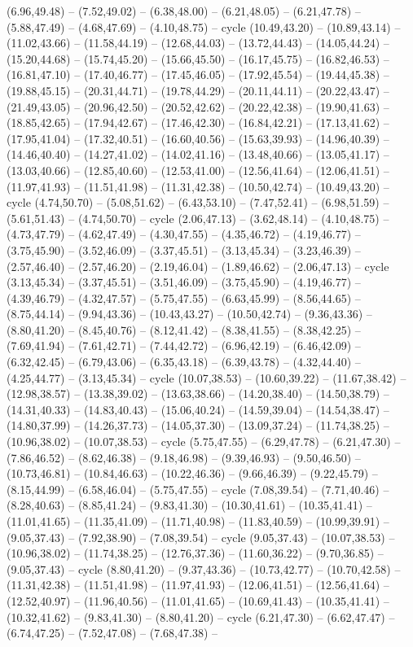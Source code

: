 {(6.96,49.48) -- (7.52,49.02) -- (6.38,48.00) -- (6.21,48.05) -- (6.21,47.78) -- (5.88,47.49) -- (4.68,47.69) -- (4.10,48.75) -- cycle (10.49,43.20) -- (10.89,43.14) -- (11.02,43.66) -- (11.58,44.19) -- (12.68,44.03) -- (13.72,44.43) -- (14.05,44.24) -- (15.20,44.68) -- (15.74,45.20) -- (15.66,45.50) -- (16.17,45.75) -- (16.82,46.53) -- (16.81,47.10) -- (17.40,46.77) -- (17.45,46.05) -- (17.92,45.54) -- (19.44,45.38) -- (19.88,45.15) -- (20.31,44.71) -- (19.78,44.29) -- (20.11,44.11) -- (20.22,43.47) -- (21.49,43.05) -- (20.96,42.50) -- (20.52,42.62) -- (20.22,42.38) -- (19.90,41.63) -- (18.85,42.65) -- (17.94,42.67) -- (17.46,42.30) -- (16.84,42.21) -- (17.13,41.62) -- (17.95,41.04) -- (17.32,40.51) -- (16.60,40.56) -- (15.63,39.93) -- (14.96,40.39) -- (14.46,40.40) -- (14.27,41.02) -- (14.02,41.16) -- (13.48,40.66) -- (13.05,41.17) -- (13.03,40.66) -- (12.85,40.60) -- (12.53,41.00) -- (12.56,41.64) -- (12.06,41.51) -- (11.97,41.93) -- (11.51,41.98) -- (11.31,42.38) -- (10.50,42.74) -- (10.49,43.20) -- cycle (4.74,50.70) -- (5.08,51.62) -- (6.43,53.10) -- (7.47,52.41) -- (6.98,51.59) -- (5.61,51.43) -- (4.74,50.70) -- cycle (2.06,47.13) -- (3.62,48.14) -- (4.10,48.75) -- (4.73,47.79) -- (4.62,47.49) -- (4.30,47.55) -- (4.35,46.72) -- (4.19,46.77) -- (3.75,45.90) -- (3.52,46.09) -- (3.37,45.51) -- (3.13,45.34) -- (3.23,46.39) -- (2.57,46.40) -- (2.57,46.20) -- (2.19,46.04) -- (1.89,46.62) -- (2.06,47.13) -- cycle (3.13,45.34) -- (3.37,45.51) -- (3.51,46.09) -- (3.75,45.90) -- (4.19,46.77) -- (4.39,46.79) -- (4.32,47.57) -- (5.75,47.55) -- (6.63,45.99) -- (8.56,44.65) -- (8.75,44.14) -- (9.94,43.36) -- (10.43,43.27) -- (10.50,42.74) -- (9.36,43.36) -- (8.80,41.20) -- (8.45,40.76) -- (8.12,41.42) -- (8.38,41.55) -- (8.38,42.25) -- (7.69,41.94) -- (7.61,42.71) -- (7.44,42.72) -- (6.96,42.19) -- (6.46,42.09) -- (6.32,42.45) -- (6.79,43.06) -- (6.35,43.18) -- (6.39,43.78) -- (4.32,44.40) -- (4.25,44.77) -- (3.13,45.34) -- cycle (10.07,38.53) -- (10.60,39.22) -- (11.67,38.42) -- (12.98,38.57) -- (13.38,39.02) -- (13.63,38.66) -- (14.20,38.40) -- (14.50,38.79) -- (14.31,40.33) -- (14.83,40.43) -- (15.06,40.24) -- (14.59,39.04) -- (14.54,38.47) -- (14.80,37.99) -- (14.26,37.73) -- (14.05,37.30) -- (13.09,37.24) -- (11.74,38.25) -- (10.96,38.02) -- (10.07,38.53) -- cycle (5.75,47.55) -- (6.29,47.78) -- (6.21,47.30) -- (7.86,46.52) -- (8.62,46.38) -- (9.18,46.98) -- (9.39,46.93) -- (9.50,46.50) -- (10.73,46.81) -- (10.84,46.63) -- (10.22,46.36) -- (9.66,46.39) -- (9.22,45.79) -- (8.15,44.99) -- (6.58,46.04) -- (5.75,47.55) -- cycle (7.08,39.54) -- (7.71,40.46) -- (8.28,40.63) -- (8.85,41.24) -- (9.83,41.30) -- (10.30,41.61) -- (10.35,41.41) -- (11.01,41.65) -- (11.35,41.09) -- (11.71,40.98) -- (11.83,40.59) -- (10.99,39.91) -- (9.05,37.43) -- (7.92,38.90) -- (7.08,39.54) -- cycle (9.05,37.43) -- (10.07,38.53) -- (10.96,38.02) -- (11.74,38.25) -- (12.76,37.36) -- (11.60,36.22) -- (9.70,36.85) -- (9.05,37.43) -- cycle (8.80,41.20) -- (9.37,43.36) -- (10.73,42.77) -- (10.70,42.58) -- (11.31,42.38) -- (11.51,41.98) -- (11.97,41.93) -- (12.06,41.51) -- (12.56,41.64) -- (12.52,40.97) -- (11.96,40.56) -- (11.01,41.65) -- (10.69,41.43) -- (10.35,41.41) -- (10.32,41.62) -- (9.83,41.30) -- (8.80,41.20) -- cycle (6.21,47.30) -- (6.62,47.47) -- (6.74,47.25) -- (7.52,47.08) -- (7.68,47.38) -- }

